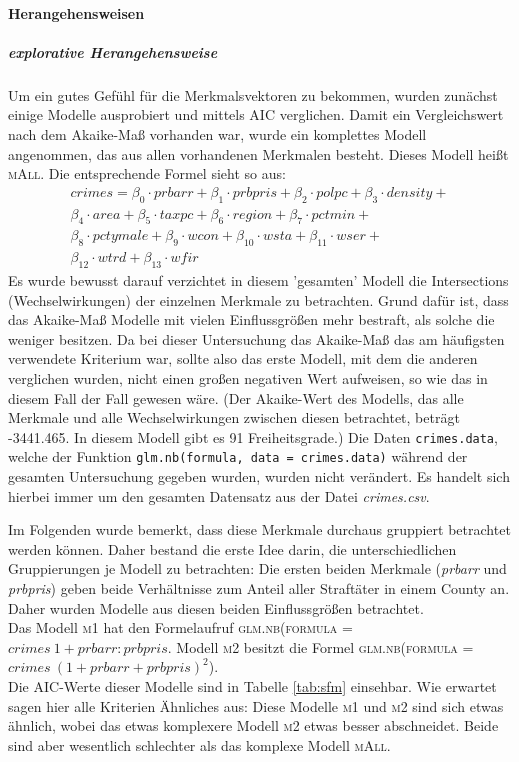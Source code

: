 \paragraph{Herangehensweisen}
\subparagraph{explorative Herangehensweise}
Um ein gutes Gef\"uhl f\"ur die Merkmalsvektoren zu bekommen, wurden zun\"achst einige Modelle ausprobiert und mittels AIC verglichen.
Damit ein Vergleichswert nach dem Akaike-Ma\ss{} vorhanden war, wurde ein komplettes Modell angenommen, das aus allen vorhandenen Merkmalen besteht. Dieses Modell hei\ss{}t \textsc{mAll}. Die entsprechende Formel sieht so aus:
\begin{equation}\begin{split}
crimes = 
\beta_0 \cdot prbarr+ \beta_1 \cdot prbpris + \beta_2  \cdot polpc +  \beta_3 \cdot density + \\
\beta_4 \cdot area + \beta_5 \cdot taxpc + \beta_6 \cdot region + \beta_7 \cdot pctmin + \\
\beta_8 \cdot pctymale + \beta_9 \cdot wcon + \beta_{10} \cdot wsta + \beta_{11} \cdot wser + \\
\beta_{12} \cdot wtrd + \beta_{13} \cdot wfir
\end{split}
\end{equation}
Es wurde bewusst darauf verzichtet in diesem 'gesamten' Modell die Intersections (Wechselwirkungen) der einzelnen Merkmale zu betrachten. Grund daf\"ur ist, dass das Akaike-Ma\ss{} Modelle mit vielen Einflussgr\"o\ss{}en mehr bestraft, als solche die weniger besitzen. Da bei dieser Untersuchung das Akaike-Ma\ss{} das am h\"aufigsten verwendete Kriterium war, sollte also das erste Modell, mit dem die anderen verglichen wurden, nicht einen gro\ss{}en negativen Wert aufweisen, so wie das in diesem Fall der Fall gewesen w\"are. (Der Akaike-Wert des Modells, das alle Merkmale und alle Wechselwirkungen zwischen diesen betrachtet, betr\"agt -3441.465. In diesem Modell gibt es 91 Freiheitsgrade.)
Die Daten \texttt{crimes.data}, welche der Funktion \texttt{glm.nb(formula, data = crimes.data)} w\"ahrend der gesamten Untersuchung gegeben wurden, wurden nicht ver\"andert. Es handelt sich hierbei immer um den gesamten Datensatz aus der Datei \textit{crimes.csv}.
\par\smallskip
Im Folgenden wurde bemerkt, dass diese Merkmale durchaus gruppiert betrachtet werden k\"onnen. Daher bestand die erste Idee darin, die unterschiedlichen Gruppierungen je Modell zu betrachten:
Die ersten beiden Merkmale (\textit{prbarr} und \textit{prbpris}) geben beide Verh\"altnisse zum Anteil aller Straft\"ater in einem County an. Daher wurden Modelle aus diesen beiden Einflussgr\"o\ss{}en betrachtet. \\
Das Modell \textsc{m1} hat den Formelaufruf \textsc{glm.nb(formula = $crimes ~ 1 + prbarr:prbpris$}.
Modell \textsc{m2} besitzt die Formel \textsc{glm.nb(formula = $crimes ~ (1 + prbarr + prbpris)^2$)}. \\
Die AIC-Werte dieser Modelle sind in Tabelle \ref{tab:sfm} einsehbar.
Wie erwartet sagen hier alle Kriterien \"Ahnliches aus:
Diese Modelle \textsc{m1} und \textsc{m2} sind sich etwas \"ahnlich, wobei das etwas komplexere Modell \textsc{m2} etwas besser abschneidet.
Beide sind aber wesentlich schlechter als das komplexe Modell \textsc{mAll}. 

